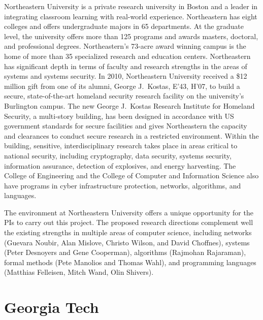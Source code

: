 \documentclass[letterpaper,twoside,11pt,headings=small]{scrartcl}
\begin{document}
Northeastern University is a private research university in Boston and a
leader in integrating classroom learning with real-world experience.
Northeastern has eight colleges and offers undergraduate majors in 65
departments. At the graduate level, the university offers more than 125
programs and awards masters, doctoral, and professional degrees.
Northeastern's 73-acre award winning campus is the home of more than 35
specialized research and education centers.  Northeastern has significant
depth in terms of faculty and research strengths in the areas of systems and
systems security. In 2010, Northeastern University received a \$12 million
gift from one of its alumni, George J.~Kostas, E'43, H'07, to build a secure,
state-of-the-art homeland security research facility on the university's
Burlington campus. The new George J.~Kostas Research Institute for Homeland
Security, a multi-story building, has been designed in accordance with US
government standards for secure facilities and gives Northeastern the capacity
and clearances to conduct secure research in a restricted environment. Within
the building, sensitive, interdisciplinary research takes place in areas
critical to national security, including cryptography, data security, systems
security, information assurance, detection of explosives, and energy
harvesting.  The College of Engineering and the College of Computer and
Information Science also have programs in cyber infrastructure protection,
networks, algorithms, and languages.

The environment at Northeastern University offers a unique opportunity for the
PIs to carry out this project.  The proposed research directions complement
well the existing strengths in multiple areas of computer science, including
networks (Guevara Noubir, Alan Mislove, Christo Wilson, and David Choffnes),
systems (Peter Desnoyers and Gene Cooperman), algorithms (Rajmohan Rajaraman),
formal methods (Pete Manolios and Thomas Wahl), and programming languages
(Matthias Felleisen, Mitch Wand, Olin Shivers).

\section*{Georgia Tech}
\end{document}
